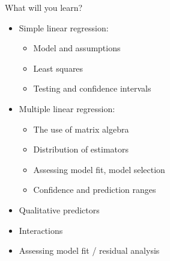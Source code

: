 \documentclass[10pt,ignorenonframetext,]{beamer}
\providecommand{\tightlist}{%
  \setlength{\itemsep}{0pt}\setlength{\parskip}{0pt}}
\begin{document}
\begin{frame}

\begin{block}{What will you learn?}

\vspace{2mm}

\begin{itemize}
\tightlist
\item
  Simple linear regression:

  \begin{itemize}
  \tightlist
  \item
    Model and assumptions
  \item
    Least squares
  \item
    Testing and confidence intervals
  \end{itemize}
\end{itemize}

\vspace{2mm}

\begin{itemize}
\tightlist
\item
  Multiple linear regression:

  \begin{itemize}
  \tightlist
  \item
    The use of matrix algebra
  \item
    Distribution of estimators
  \item
    Assessing model fit, model selection
  \item
    Confidence and prediction ranges
  \end{itemize}
\end{itemize}

\vspace{2mm}

\begin{itemize}
\tightlist
\item
  Qualitative predictors
\end{itemize}

\vspace{2mm}

\begin{itemize}
\tightlist
\item
  Interactions
\end{itemize}

\vspace{2mm}

\begin{itemize}
\tightlist
\item
  Assessing model fit / residual analysis
\end{itemize}

\end{block}

\end{frame}
\end{document}
